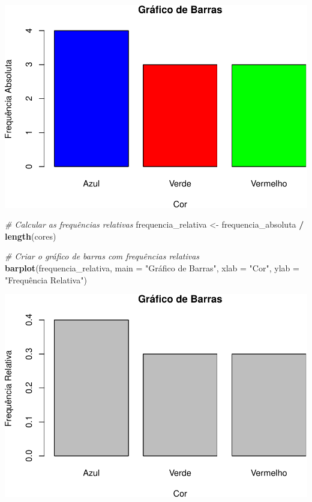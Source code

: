 \documentclass[
]{book}
\newenvironment{Shaded}{\begin{snugshade}}{\end{snugshade}}
\newcommand{\AttributeTok}[1]{\textcolor[rgb]{0.13,0.29,0.53}{#1}}
\newcommand{\CommentTok}[1]{\textcolor[rgb]{0.56,0.35,0.01}{\textit{#1}}}
\newcommand{\FunctionTok}[1]{\textcolor[rgb]{0.13,0.29,0.53}{\textbf{#1}}}
\newcommand{\NormalTok}[1]{#1}
\newcommand{\OtherTok}[1]{\textcolor[rgb]{0.56,0.35,0.01}{#1}}
\newcommand{\SpecialCharTok}[1]{\textcolor[rgb]{0.81,0.36,0.00}{\textbf{#1}}}
\newcommand{\StringTok}[1]{\textcolor[rgb]{0.31,0.60,0.02}{#1}}
\theoremstyle{definition}
\theoremstyle{definition}
\theoremstyle{definition}
\theoremstyle{definition}
\theoremstyle{remark}
\begin{document}
\includegraphics{meuLivro2_files/figure-latex/unnamed-chunk-99-1.pdf}

\begin{Shaded}
\begin{Highlighting}[]
\CommentTok{\# Calcular as frequências relativas}
\NormalTok{frequencia\_relativa }\OtherTok{\textless{}{-}}\NormalTok{ frequencia\_absoluta }\SpecialCharTok{/} \FunctionTok{length}\NormalTok{(cores)  }
    
\CommentTok{\# Criar o gráfico de barras com frequências relativas}
\FunctionTok{barplot}\NormalTok{(frequencia\_relativa,         }
  \AttributeTok{main =} \StringTok{"Gráfico de Barras"}\NormalTok{,         }
  \AttributeTok{xlab =} \StringTok{"Cor"}\NormalTok{,         }
  \AttributeTok{ylab =} \StringTok{"Frequência Relativa"}\NormalTok{) }
\end{Highlighting}
\end{Shaded}

\includegraphics{meuLivro2_files/figure-latex/unnamed-chunk-100-1.pdf}
\end{document}
